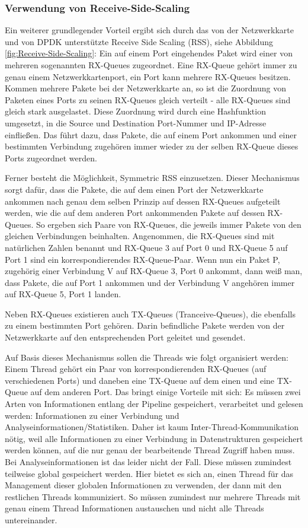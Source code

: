 \documentclass[../review_1.tex]{subfiles}
\begin{document}
\subsubsection{Verwendung von Receive-Side-Scaling}
Ein weiterer grundlegender Vorteil ergibt sich durch das von der Netzwerkkarte und von DPDK unterstützte Receive Side Scaling (RSS), siehe Abbildung \ref{fig:Receive-Side-Scaling}: Ein auf einem Port eingehendes Paket wird einer von mehreren sogenannten RX-Queues zugeordnet. Eine RX-Queue gehört immer zu genau einem Netzwerkkartenport, ein Port kann mehrere RX-Queues besitzen. Kommen mehrere Pakete bei der Netzwerkkarte an, so ist die Zuordnung von Paketen eines Ports zu seinen RX-Queues gleich verteilt - alle RX-Queues sind gleich stark ausgelastet. Diese Zuordnung wird durch eine Hashfunktion umgesetzt, in die Source und Destination Port-Nummer und IP-Adresse einfließen. Das führt dazu, dass Pakete, die auf einem Port ankommen und einer bestimmten Verbindung zugehören immer wieder zu der selben RX-Queue dieses Ports zugeordnet werden.

Ferner besteht die Möglichkeit, Symmetric RSS einzusetzen. Dieser Mechanismus sorgt dafür, dass die Pakete, die auf dem einen Port der Netzwerkkarte ankommen nach genau dem selben Prinzip auf dessen RX-Queues aufgeteilt werden, wie die auf dem anderen Port ankommenden Pakete auf dessen RX-Queues. So ergeben sich Paare von RX-Queues, die jeweils immer Pakete von den gleichen Verbindungen beinhalten. Angenommen, die RX-Queues sind mit natürlichen Zahlen benannt und RX-Queue 3 auf Port 0 und RX-Queue 5 auf Port 1 sind ein korrespondierendes RX-Queue-Paar. Wenn nun ein Paket P, zugehörig einer Verbindung V auf RX-Queue 3, Port 0 ankommt, dann weiß man, dass Pakete, die auf Port 1 ankommen und der Verbindung V angehören immer auf RX-Queue 5, Port 1 landen.

Neben RX-Queues existieren auch TX-Queues (Tranceive-Queues), die ebenfalls zu einem bestimmten Port gehören. Darin befindliche Pakete werden von der Netzwerkkarte auf den entsprechenden Port geleitet und gesendet.

Auf Basis dieses Mechanismus sollen die Threads wie folgt organisiert werden: Einem Thread gehört ein Paar von korrespondierenden RX-Queues (auf verschiedenen Ports) und daneben eine TX-Queue auf dem einen und eine TX-Queue auf dem anderen Port. Das bringt einige Vorteile mit sich: Es müssen zwei Arten von Informationen entlang der Pipeline gespeichert, verarbeitet und gelesen werden: Informationen zu einer Verbindung und Analyseinformationen/Statistiken. Daher ist kaum Inter-Thread-Kommunikation nötig, weil alle Informationen zu einer Verbindung in Datenstrukturen gespeichert werden können, auf die nur genau der bearbeitende Thread Zugriff haben muss. Bei Analyseinformationen ist das leider nicht der Fall. Diese müssen zumindest teilweise global gespeichert werden. Hier bietet es sich an, einen Thread für das Management dieser globalen Informationen zu verwenden, der dann mit den restlichen Threads kommuniziert. So müssen zumindest nur mehrere Threads mit genau einem Thread Informationen austauschen und nicht alle Threads untereinander.
\end{document}
